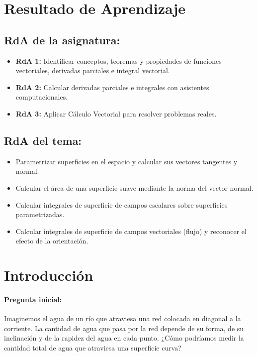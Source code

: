 \documentclass[a4,11pt]{aleph-notas}
\begin{document}
\encabezado

\section*{Resultado de Aprendizaje}

\subsection*{RdA de la asignatura:}
\begin{itemize}[leftmargin=*]
    \item \textbf{RdA 1:} Identificar conceptos, teoremas y propiedades de funciones vectoriales, derivadas parciales e integral vectorial.
    \item \textbf{RdA 2:} Calcular derivadas parciales e integrales con asistentes computacionales.
    \item \textbf{RdA 3:} Aplicar Cálculo Vectorial para resolver problemas reales.
\end{itemize}

\subsection*{RdA del tema:}
\begin{itemize}[leftmargin=*]
    \item Parametrizar superficies en el espacio y calcular sus vectores tangentes y normal.
    \item Calcular el área de una superficie suave mediante la norma del vector normal.
    \item Calcular integrales de superficie de campos escalares sobre superficies parametrizadas.
    \item Calcular integrales de superficie de campos vectoriales (flujo) y reconocer el efecto de la orientación.
\end{itemize}

\section*{Introducción}

\paragraph{Pregunta inicial:}
Imaginemos el agua de un río que atraviesa una red colocada en diagonal a la corriente. La cantidad de agua que pasa por la red depende de su forma, de su inclinación y de la rapidez del agua en cada punto. ¿Cómo podríamos medir la cantidad total de agua que atraviesa una superficie curva?
\end{document}
